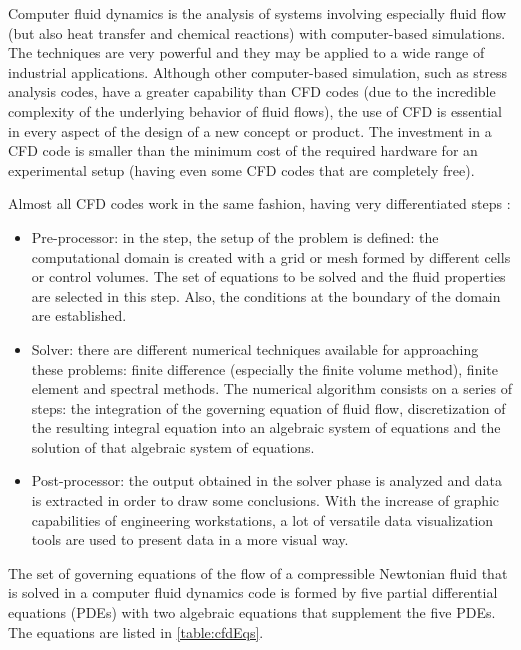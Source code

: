 Computer fluid dynamics is the analysis of systems involving especially fluid flow (but also heat transfer and chemical reactions) with computer-based simulations. The techniques are very powerful and they may be applied to a wide range of industrial applications. Although other computer-based simulation, such as stress analysis codes, have a greater capability than CFD codes (due to the incredible complexity of the underlying behavior of fluid flows), the use of CFD is essential in every aspect of the design of a new concept or product. The investment in a CFD code is smaller than the minimum cost of the required hardware for an experimental setup (having even some CFD codes that are completely free). 

Almost all CFD codes work in the same fashion, having very differentiated steps \cite{versteeg1995computational}:
\begin{itemize}
    \item Pre-processor: in the step, the setup of the problem is defined: the computational domain is created with a grid or mesh formed by different cells or control volumes. The set of equations to be solved and the fluid properties are selected in this step. Also, the conditions at the boundary of the domain are established. 
    \item Solver: there are different numerical techniques available for approaching these problems: finite difference (especially the finite volume method), finite element and spectral methods. The numerical algorithm consists on a series of steps: the integration of the governing equation of fluid flow, discretization of the resulting integral equation into an algebraic system of equations and the solution of that algebraic system of equations. 
    \item Post-processor: the output obtained in the solver phase is analyzed and data is extracted in order to draw some conclusions. With the increase of graphic capabilities of engineering workstations, a lot of versatile data visualization tools are used to present data in a more visual way. 
\end{itemize}

The set of governing equations of the flow of a compressible Newtonian fluid that is solved in a computer fluid dynamics code is formed by five partial differential equations (PDEs) with two algebraic equations that supplement the five PDEs. The equations are listed in
\ref{table:cfdEqs}.

\newpage

